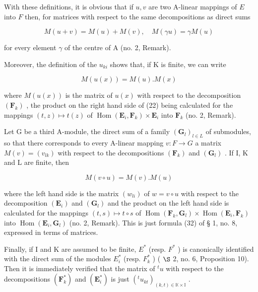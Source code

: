 With these definitions, it is obvious that if \(u, v\) are two A-linear mappings of \(E\) into \(F\) then, for matrices with respect to the same decompositions as direct sums

\[
M (u + v) = M (u) + M (v), \quad M (\gamma u) = \gamma M (u)\tag{21}
\]

for every element \(\gamma\) of the centre of A (no. 2, Remark).

Moreover, the definition of the \(u_{ki}\) shows that, if K is finite, we can write

\[
M (u (x)) = M (u). M (x)\tag{22}
\]

where \(M(u(x))\) is the matrix of \(u(x)\) with respect to the decomposition \((\mathbf{F}_k)\) , the product on the right hand side of (22) being calculated for the mappings \((t, z) \mapsto t(z)\) of \(\operatorname{Hom}(\mathbf{E}_i, \mathbf{F}_k) \times \mathbf{E}_i\) into \(\mathbf{F}_k\) (no. 2, Remark).

Let G be a third A-module, the direct sum of a family \((\mathbf{G}_{l})_{l\in L}\) of submodules, so that there corresponds to every A-linear mapping \(v:F\to G\) a matrix \(M(v)=(v_{lk})\) with respect to the decompositions \((\mathbf{F}_{k})\) and \((\mathbf{G}_{l})\) . If I, K and L are finite, then

\[
M (v \circ u) = M (v). M (u)\tag{23}
\]

where the left hand side is the matrix \((w_{li})\) of \(w = v \circ u\) with respect to the decomposition \((\mathbf{E}_i)\) and \((\mathbf{G}_l)\) and the product on the left hand side is calculated for the mappings \((t, s) \mapsto t \circ s\) of \(\operatorname{Hom}(\mathbf{F}_k, \mathbf{G}_l) \times \operatorname{Hom}(\mathbf{E}_i, \mathbf{F}_k)\) into \(\operatorname{Hom}(\mathbf{E}_i, \mathbf{G}_l)\) (no. 2, Remark). This is just formula (32) of § 1, no. 8, expressed in terms of matrices.

Finally, if I and K are assumed to be finite, \(E^{*}\) (resp. \(F^{*}\) ) is canonically identified with the direct sum of the modules \(E_{i}^{*}\) (resp. \(F_{k}^{*}\) ) ( \(\S\) 2, no. 6, Proposition 10). Then it is immediately verified that the matrix of \(^{t}u\) with respect to the decompositions \((\mathbf{F}_{k}^{*})\) and \((\mathbf{E}_{i}^{*})\) is just \((^{t}u_{kt})_{(k,t)\in\mathbb{K}\times\mathbb{I}}\) .

